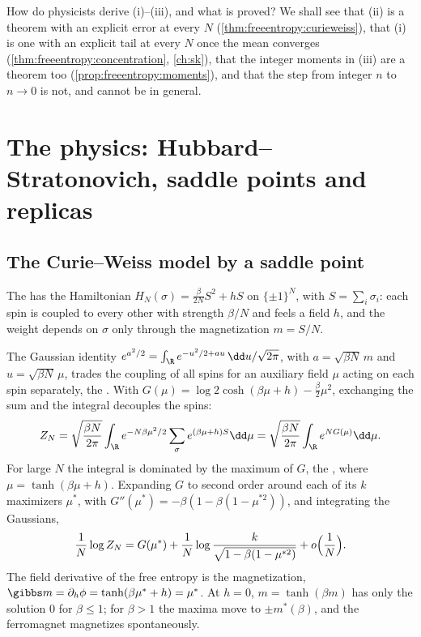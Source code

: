 \begin{refsection}
How do physicists derive (i)--(iii), and what is proved? We shall see that (ii) is a theorem with an explicit error at every $N$ (\cref{thm:freeentropy:curieweiss}), that (i) is one with an explicit tail at every $N$ once the mean converges (\cref{thm:freeentropy:concentration}, \cref{ch:sk}), that the integer moments in (iii) are a theorem too (\cref{prop:freeentropy:moments}), and that the step from integer $n$ to $n\to0$ is not, and cannot be in general.

\section{The physics: Hubbard--Stratonovich, saddle points and replicas}\label{sec:freeentropy:physics}

\subsection{The Curie--Weiss model by a saddle point}\label{sec:freeentropy:cw}

The  has the Hamiltonian $H_N(\sigma)=\frac\beta{2N}S^2+hS$ on $\{\pm1\}^N$, with $S=\sum_i\sigma_i$: each spin is coupled to every other with strength $\beta/N$ and feels a field $h$, and the weight depends on $\sigma$ only through the magnetization $m=S/N$.

\begin{heuristic}
The Gaussian identity $e^{a^2/2}=\int_\R e^{-u^2/2+au}\,\dd u/\sqrt{2\pi}$, with $a=\sqrt{\beta N}\,m$ and $u=\sqrt{\beta N}\,\mu$, trades the coupling of all spins for an auxiliary field $\mu$ acting on each spin separately, the  \parencite{Stratonovich1957,Hubbard1959}. With $G(\mu)=\log2\cosh(\beta\mu+h)-\frac\beta2\mu^2$, exchanging the sum and the integral decouples the spins:
\begin{equation}\label{eq:freeentropy:hs}
Z_N=\sqrt{\frac{\beta N}{2\pi}}\int_\R e^{-N\beta\mu^2/2}\sum_\sigma e^{(\beta\mu+h)S}\dd\mu=\sqrt{\frac{\beta N}{2\pi}}\int_\R e^{NG(\mu)}\dd\mu .
\end{equation}
For large $N$ the integral is dominated by the maximum of $G$, the , where $\mu=\tanh(\beta\mu+h)$. Expanding $G$ to second order around each of its $k$ maximizers $\mu^*$, with $G''(\mu^*)=-\beta(1-\beta(1-\mu^{*2}))$, and integrating the Gaussians,
\[
\frac1N\log Z_N=G(\mu^*)+\frac1N\log\frac k{\sqrt{1-\beta(1-\mu^{*2})}}+o\Bigl(\frac1N\Bigr).
\]
The field derivative of the free entropy is the magnetization, $\gibbs m=\partial_h\phi=\tanh(\beta\mu^*+h)=\mu^*$. At $h=0$, $m=\tanh(\beta m)$ has only the solution $0$ for $\beta\le1$; for $\beta>1$ the maxima move to $\pm m^*(\beta)$, and the ferromagnet magnetizes spontaneously.
\end{heuristic}


\end{refsection}
